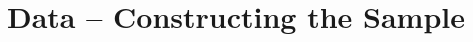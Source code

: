 \documentclass[12pt]{article}
\begin{document}
\section{Data -- Constructing the Sample}
\end{document}
